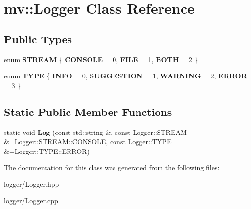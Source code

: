 \hypertarget{classmv_1_1_logger}{}\section{mv\+:\+:Logger Class Reference}
\label{classmv_1_1_logger}
\subsection*{Public Types}
\begin{DoxyCompactItemize}
\item 
\mbox{\label{classmv_1_1_logger_ad1faa46e6c5ea053f88c2f35ef0a5687}} 
enum {\bfseries S\+T\+R\+E\+AM} \{ {\bfseries C\+O\+N\+S\+O\+LE} = 0, 
{\bfseries F\+I\+LE} = 1, 
{\bfseries B\+O\+TH} = 2
 \}
\item 
\mbox{\label{classmv_1_1_logger_a02817aad7d75e78221f0c57927956697}} 
enum {\bfseries T\+Y\+PE} \{ {\bfseries I\+N\+FO} = 0, 
{\bfseries S\+U\+G\+G\+E\+S\+T\+I\+ON} = 1, 
{\bfseries W\+A\+R\+N\+I\+NG} = 2, 
{\bfseries E\+R\+R\+OR} = 3
 \}
\end{DoxyCompactItemize}
\subsection*{Static Public Member Functions}
\begin{DoxyCompactItemize}
\item 
\mbox{\label{classmv_1_1_logger_a8310db2d7031d84e1081f27157fac7a4}} 
static void {\bfseries Log} (const std\+::string \&, const Logger\+::\+S\+T\+R\+E\+AM \&=Logger\+::\+S\+T\+R\+E\+A\+M\+::\+C\+O\+N\+S\+O\+LE, const Logger\+::\+T\+Y\+PE \&=Logger\+::\+T\+Y\+P\+E\+::\+E\+R\+R\+OR)
\end{DoxyCompactItemize}


The documentation for this class was generated from the following files\+:\begin{DoxyCompactItemize}
\item 
logger/Logger.\+hpp\item 
logger/Logger.\+cpp\end{DoxyCompactItemize}
